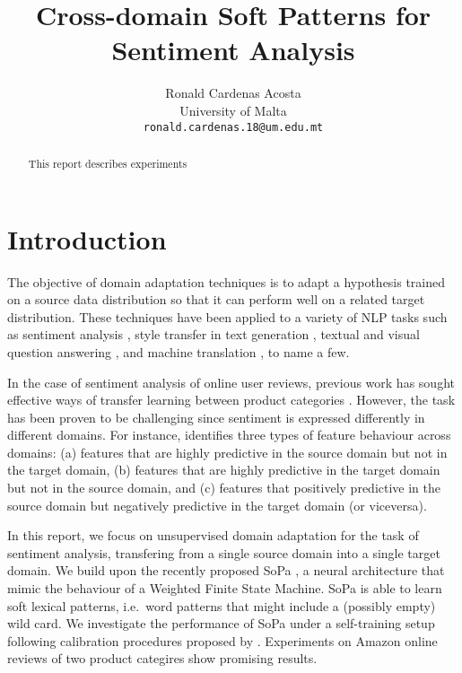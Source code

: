 \documentclass[11pt,a4paper]{article}
\title{Cross-domain Soft Patterns for Sentiment Analysis}
\author{Ronald Cardenas Acosta\\
  University of Malta \\
  {\tt ronald.cardenas.18@um.edu.mt} \\}
\date{}
\begin{document}
\maketitle
\begin{abstract}
  This report describes experiments 
\end{abstract}


\section{Introduction}


The objective of domain adaptation techniques is to adapt a hypothesis trained on a source data distribution so that it can perform well on a related target distribution.
These techniques have been applied to a variety of NLP tasks such as sentiment analysis \cite{blitzer2007biographies,mcauley2013hidden,mcauley2015image,ruder2018strong}, style transfer in text generation \cite{fu2018style,NIPS2018_7959,peng-etal-2018-towards}, textual and visual question answering \cite{chao2018cross,zhao2018finding}, and machine translation \cite{etchegoyhen2018evaluating,britz2017effective}, to name a few.

In the case of sentiment analysis of online user reviews, previous work has sought effective ways of transfer learning between product categories \cite{blitzer2007biographies,ruder2018strong}. However, the task has been proven to be challenging since sentiment is expressed differently in different domains.
For instance, \citet{blitzer2007biographies} identifies three types of feature behaviour across domains: (a) features that are highly predictive in the source domain but not in the target domain, (b) features that are highly predictive in the target domain but not in the source domain, and (c) features that positively predictive in the source domain but negatively predictive in the target domain (or viceversa).

In this report, we focus on unsupervised domain adaptation for the task of sentiment analysis, transfering from a single source domain into a single target domain.
We build upon the recently proposed {\sc SoPa} \cite{schwartz2018sopa}, a neural architecture that mimic the behaviour of a Weighted Finite State Machine.
{\sc SoPa} is able to learn soft lexical patterns, i.e.\ word patterns that might include a (possibly empty) wild card.
We investigate the performance of {\sc SoPa} under a self-training setup following calibration procedures proposed by \citet{ruder2018strong}.
Experiments on Amazon online reviews of two product categires show promising results.
\end{document}
